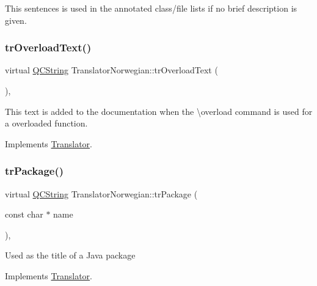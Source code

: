 This sentences is used in the annotated class/file lists if no brief description is given. \mbox{\label{class_translator_norwegian_a9cf7fd5998841687bedaabdc534521b2}} 
\subsubsection{\texorpdfstring{trOverloadText()}{trOverloadText()}}
{\footnotesize\ttfamily virtual \mbox{\hyperlink{class_q_c_string}{Q\+C\+String}} Translator\+Norwegian\+::tr\+Overload\+Text (\begin{DoxyParamCaption}{ }\end{DoxyParamCaption})\hspace{0.3cm}{\ttfamily [inline]}, {\ttfamily [virtual]}}

This text is added to the documentation when the \textbackslash{}overload command is used for a overloaded function. 

Implements \mbox{\hyperlink{class_translator}{Translator}}.

\mbox{\label{class_translator_norwegian_ac9c006ac458ddf2eaf91581ff71c4e38}} 
\subsubsection{\texorpdfstring{trPackage()}{trPackage()}}
{\footnotesize\ttfamily virtual \mbox{\hyperlink{class_q_c_string}{Q\+C\+String}} Translator\+Norwegian\+::tr\+Package (\begin{DoxyParamCaption}\item[{const char $\ast$}]{name }\end{DoxyParamCaption})\hspace{0.3cm}{\ttfamily [inline]}, {\ttfamily [virtual]}}

Used as the title of a Java package 

Implements \mbox{\hyperlink{class_translator}{Translator}}.

\mbox{\label{class_translator_norwegian_aa694b0d893cb3f350746b32a392b9902}} 
